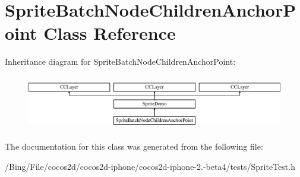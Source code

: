 \hypertarget{interface_sprite_batch_node_children_anchor_point}{\section{Sprite\-Batch\-Node\-Children\-Anchor\-Point Class Reference}
\label{interface_sprite_batch_node_children_anchor_point}
}
Inheritance diagram for Sprite\-Batch\-Node\-Children\-Anchor\-Point\-:\begin{figure}[H]
\begin{center}
\leavevmode
\includegraphics[height=2.403433cm]{interface_sprite_batch_node_children_anchor_point}
\end{center}
\end{figure}


The documentation for this class was generated from the following file\-:\begin{DoxyCompactItemize}
\item 
/\-Bing/\-File/cocos2d/cocos2d-\/iphone/cocos2d-\/iphone-\/2.-\/beta4/tests/Sprite\-Test.\-h\end{DoxyCompactItemize}
